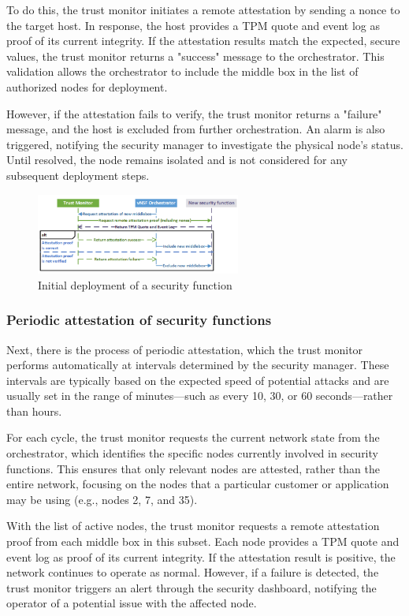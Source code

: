 To do this, the trust monitor initiates a remote attestation by
sending a nonce to the target host. In response, the host provides a
TPM quote and event log as proof of its current integrity. If the
attestation results match the expected, secure values, the trust
monitor returns a "success" message to the orchestrator. This
validation allows the orchestrator to include the middle box in the
list of authorized nodes for deployment.

However, if the attestation fails to verify, the trust monitor returns
a "failure" message, and the host is excluded from further
orchestration. An alarm is also triggered, notifying the security
manager to investigate the physical node's status. Until resolved, the
node remains isolated and is not considered for any subsequent
deployment steps.
\begin{figure}[H]
  \centering
  \includegraphics[width=0.6\textwidth]{img/shield deployment.png}
  \caption{Initial deployment of a security function}
\end{figure}

\subsubsection{Periodic attestation of security functions}
Next, there is the process of periodic attestation, which the trust
monitor performs automatically at intervals determined by the security
manager. These intervals are typically based on the expected speed of
potential attacks and are usually set in the range of minutes—such as
every 10, 30, or 60 seconds—rather than hours.

For each cycle, the trust monitor requests the current network state
from the orchestrator, which identifies the specific nodes currently
involved in security functions. This ensures that only relevant nodes
are attested, rather than the entire network, focusing on the nodes
that a particular customer or application may be using (e.g., nodes 2,
7, and 35).

With the list of active nodes, the trust monitor requests a remote
attestation proof from each middle box in this subset. Each node
provides a TPM quote and event log as proof of its current integrity.
If the attestation result is positive, the network continues to
operate as normal. However, if a failure is detected, the trust
monitor triggers an alert through the security dashboard, notifying
the operator of a potential issue with the affected node. 

